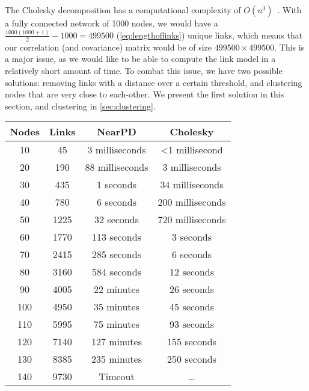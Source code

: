 The Cholesky decomposition has a computational complexity of $O(n^3)$~\cite{Press:2007:NRE:1403886}. With a fully connected network of 1000 nodes, we would have a $\frac{1000(1000+1)}{2} - 1000 = 499500$ (\autoref{eq:lengthoflinks}) unique links, which means that our correlation (and covariance) matrix would be of size $499500 \times 499500$. This is a major issue, as we would like to be able to compute the link model in a relatively short amount of time. To combat this issue, we have two possible solutions: removing links with a distance over a certain threshold, and clustering nodes that are very close to each-other. We present the first solution in this section, and clustering in \autoref{sec:clustering}.

\begin{table}[H]
    \centering
    \begin{tabular}{|c|c|c|c|}
        \hline
        Nodes & Links & NearPD          & Cholesky                 \\\hline
        10    & 45    & 3 milliseconds  & \textless{}1 millisecond \\\hline
        20    & 190   & 88 milliseconds & 3 milliseconds           \\\hline
        30    & 435   & 1 seconds       & 34 milliseconds          \\\hline
        40    & 780   & 6 seconds       & 200 milliseconds         \\\hline
        50    & 1225  & 32 seconds      & 720 milliseconds         \\\hline
        60    & 1770  & 113 seconds     & 3 seconds                \\\hline
        70    & 2415  & 285 seconds     & 6 seconds                \\\hline
        80    & 3160  & 584 seconds     & 12 seconds               \\\hline
        90    & 4005  & 22 minutes      & 26 seconds               \\\hline
        100   & 4950  & 35 minutes      & 45 seconds               \\\hline
        110   & 5995  & 75 minutes      & 93 seconds               \\\hline
        120   & 7140  & 127 minutes     & 155 seconds              \\\hline
        130   & 8385  & 235 minutes     & 250 seconds              \\\hline
        140   & 9730  & Timeout         & \dots                    \\\hline%

\end{tabular}
\end{table}
